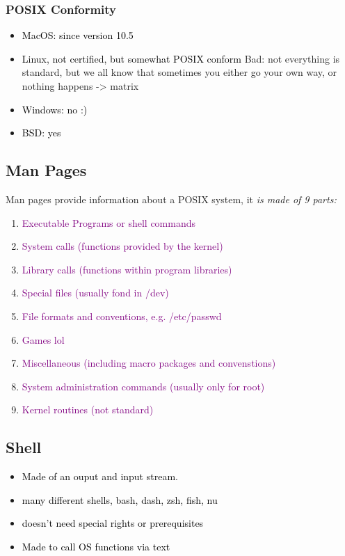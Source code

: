 \documentclass[main.tex,fontsize=8pt,paper=a4,paper=portrait,DIV=calc,]{scrartcl}
\begin{document}
\subsubsection{POSIX Conformity}
\begin{itemize}
\item \textcolor{black}{MacOS: since version 10.5}
\item \textcolor{black}{Linux, not certified, but somewhat POSIX conform}\newline
  Bad: not everything is standard, but we all know that sometimes you either go your own way, or nothing happens -> matrix
\item \textcolor{black}{Windows: no :)}
\item \textcolor{black}{BSD: yes}
\end{itemize} 

\subsection{Man Pages}
Man pages provide information about a POSIX system, it \emph{is made of 9 parts:}
\begin{enumerate}
\item \textcolor{purple}{Executable Programs or shell commands}
\item \textcolor{purple}{System calls (functions provided by the kernel)}
\item \textcolor{purple}{Library calls (functions within program libraries)}
\item \textcolor{purple}{Special files (usually fond in /dev)}
\item \textcolor{purple}{File formats and conventions, e.g. /etc/passwd}
\item \textcolor{purple}{Games lol}
\item \textcolor{purple}{Miscellaneous (including macro packages and convenstions)}
\item \textcolor{purple}{System administration commands (usually only for root)}
\item \textcolor{purple}{Kernel routines (not standard)}
\end{enumerate} 

\subsection{Shell}
\begin{itemize}
\item \textcolor{black}{Made of an ouput and input stream.}
\item \textcolor{black}{many different shells, bash, dash, zsh, fish, nu}
\item \textcolor{black}{doesn't need special rights or prerequisites}
\item \textcolor{black}{Made to call OS functions via text}
\end{itemize} 
\end{document}
